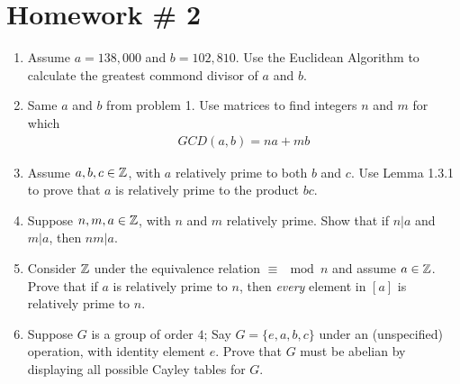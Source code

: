 \section*{Homework \# 2}
\begin{enumerate}
    \item Assume $a=138,000$ and $b=102,810$. Use the Euclidean Algorithm to calculate the greatest commond divisor of $a$ and $b$.
    \item Same $a$ and $b$ from problem 1. Use matrices to find integers $n$ and $m$ for which
    \begin{align}
        GCD(a,b)=na+mb \nonumber
    \end{align}
    \item Assume $a,b,c\in {\mathbb{ Z}}$, with $a$ relatively prime to both $b$ and $c$. Use Lemma 1.3.1 to prove that $a$ is relatively prime to the product $bc$.
    \item Suppose $n,m,a \in {\mathbb{ Z}}$, with $n$ and $m$ relatively prime. Show that if $n|a$ and $m|a$, then $nm|a$.
    \item Consider ${\mathbb{ Z}}$ under the equivalence relation $\equiv \mod n$ and assume $a\in {\mathbb{ Z}}$. Prove that if $a$ is relatively prime to $n$, then \textit{every} element in $[a]$ is relatively prime to $n$.
    \item Suppose $G$ is a group of order $4$; Say $G=\{e,a,b,c\}$ under an (unspecified) operation, with identity element $e$. Prove that $G$ must be abelian by displaying all possible Cayley tables for $G$.
\end{enumerate}
\newpage

